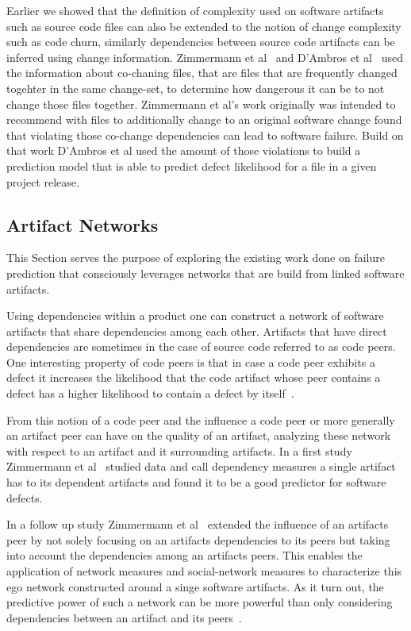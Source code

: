 Earlier we showed that the definition of complexity used on software artifacts such as source code files can also be extended to the notion of change complexity such as code churn, similarly dependencies between source code artifacts can be inferred using change information.
Zimmermann et al~\cite{zimmermann:icse:2004} and D'Ambros et al~\cite{dambros:wcre:2009} used the information about co-chaning files, that are files that are frequently changed togehter in the same change-set, to determine how dangerous it can be to not change those files together.
Zimmermann et al's work originally was intended to recommend with files to additionally change to an original software change  found that violating those co-change dependencies can lead to software failure.
Build on that work D'Ambros et al used the amount of those violations to build a prediction model that is able to predict defect likelihood for a file in a given project release. 


\subsection{Artifact Networks}
\label{chap:6:an}
This Section serves the purpose of exploring the existing work done on failure prediction that consciously leverages networks that are build from linked software artifacts.

Using dependencies within a product one can construct a network of software artifacts that share dependencies among each other.
Artifacts that have direct dependencies are sometimes in the case of source code referred to as code peers.
One interesting property of code peers is that in case a code peer exhibits a defect it increases the likelihood that the code artifact whose peer contains a defect has a higher likelihood to contain a defect by itself~\cite{nguyen:icse:2010}.

From this notion of a code peer and the influence a code peer or more generally an artifact peer can have on the quality of an artifact, analyzing these network with respect to an artifact and it surrounding artifacts.
In a first study Zimmermann et al~\cite{zimmermann:icse:2008} studied data and call dependency measures a single artifact has to its dependent artifacts and found it to be a good predictor for software defects.

In a follow up study Zimmermann et al~\cite{zimmermann:esem:2009} extended the influence of an artifacts peer by not solely focusing on an artifacts dependencies to its peers but taking into account the dependencies among an artifacts peers.
This enables the application of network measures and social-network measures to characterize this ego network constructed around a singe software artifacts.
As it turn out, the predictive power of such a network can be more powerful than only considering dependencies between an artifact and its peers~\cite{zimmermann:esem:2009}.

